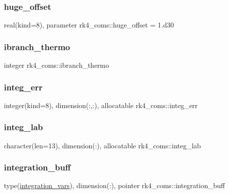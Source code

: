 \subsubsection{\texorpdfstring{huge\+\_\+offset}{huge\_offset}}
{\footnotesize\ttfamily real(kind=8), parameter rk4\+\_\+coms\+::huge\+\_\+offset = 1.d30}

\mbox{\label{namespacerk4__coms_a33cf51cec0937e19a61030894187ddbc}} 
\subsubsection{\texorpdfstring{ibranch\+\_\+thermo}{ibranch\_thermo}}
{\footnotesize\ttfamily integer rk4\+\_\+coms\+::ibranch\+\_\+thermo}

\mbox{\label{namespacerk4__coms_aecab6dfff0aaea0938b5c59d550860bc}} 
\subsubsection{\texorpdfstring{integ\+\_\+err}{integ\_err}}
{\footnotesize\ttfamily integer(kind=8), dimension(\+:,\+:), allocatable rk4\+\_\+coms\+::integ\+\_\+err}

\mbox{\label{namespacerk4__coms_a4f5c8dc79c821a459a356f283b4831c8}} 
\subsubsection{\texorpdfstring{integ\+\_\+lab}{integ\_lab}}
{\footnotesize\ttfamily character(len=13), dimension(\+:), allocatable rk4\+\_\+coms\+::integ\+\_\+lab}

\mbox{\label{namespacerk4__coms_a3c62cf3b7294822d789a72c33ed42538}} 
\subsubsection{\texorpdfstring{integration\+\_\+buff}{integration\_buff}}
{\footnotesize\ttfamily type(\hyperlink{structrk4__coms_1_1integration__vars}{integration\+\_\+vars}), dimension(\+:), pointer rk4\+\_\+coms\+::integration\+\_\+buff}

